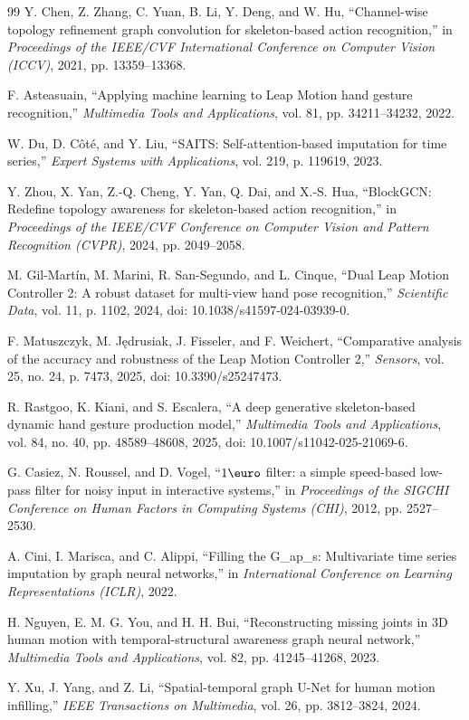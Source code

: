 \documentclass[10pt,twocolumn]{article}
\begin{document}
\begin{thebibliography}{99}
Y. Chen, Z. Zhang, C. Yuan, B. Li, Y. Deng, and W. Hu, ``Channel-wise topology refinement graph convolution for skeleton-based action recognition,'' in \textit{Proceedings of the IEEE/CVF International Conference on Computer Vision (ICCV)}, 2021, pp. 13359--13368.

F. Asteasuain, ``Applying machine learning to Leap Motion hand gesture recognition,'' \textit{Multimedia Tools and Applications}, vol. 81, pp. 34211--34232, 2022.

W. Du, D. C\^{o}t\'{e}, and Y. Liu, ``SAITS: Self-attention-based imputation for time series,'' \textit{Expert Systems with Applications}, vol. 219, p. 119619, 2023.

Y. Zhou, X. Yan, Z.-Q. Cheng, Y. Yan, Q. Dai, and X.-S. Hua, ``BlockGCN: Redefine topology awareness for skeleton-based action recognition,'' in \textit{Proceedings of the IEEE/CVF Conference on Computer Vision and Pattern Recognition (CVPR)}, 2024, pp. 2049--2058.

M. Gil-Mart\'{i}n, M. Marini, R. San-Segundo, and L. Cinque, ``Dual Leap Motion Controller 2: A robust dataset for multi-view hand pose recognition,'' \textit{Scientific Data}, vol. 11, p. 1102, 2024, doi: 10.1038/s41597-024-03939-0.

F. Matuszczyk, M. J\k{e}drusiak, J. Fisseler, and F. Weichert, ``Comparative analysis of the accuracy and robustness of the Leap Motion Controller 2,'' \textit{Sensors}, vol. 25, no. 24, p. 7473, 2025, doi: 10.3390/s25247473.

R. Rastgoo, K. Kiani, and S. Escalera, ``A deep generative skeleton-based dynamic hand gesture production model,'' \textit{Multimedia Tools and Applications}, vol. 84, no. 40, pp. 48589--48608, 2025, doi: 10.1007/s11042-025-21069-6.

G. Casiez, N. Roussel, and D. Vogel, ``$1\text{\euro}$ filter: a simple speed-based low-pass filter for noisy input in interactive systems,'' in \textit{Proceedings of the SIGCHI Conference on Human Factors in Computing Systems (CHI)}, 2012, pp. 2527--2530.

A. Cini, I. Marisca, and C. Alippi, ``Filling the G\_ap\_s: Multivariate time series imputation by graph neural networks,'' in \textit{International Conference on Learning Representations (ICLR)}, 2022.

H. Nguyen, E. M. G. You, and H. H. Bui, ``Reconstructing missing joints in 3D human motion with temporal-structural awareness graph neural network,'' \textit{Multimedia Tools and Applications}, vol. 82, pp. 41245--41268, 2023.

Y. Xu, J. Yang, and Z. Li, ``Spatial-temporal graph U-Net for human motion infilling,'' \textit{IEEE Transactions on Multimedia}, vol. 26, pp. 3812--3824, 2024.

\end{thebibliography}
\end{document}
